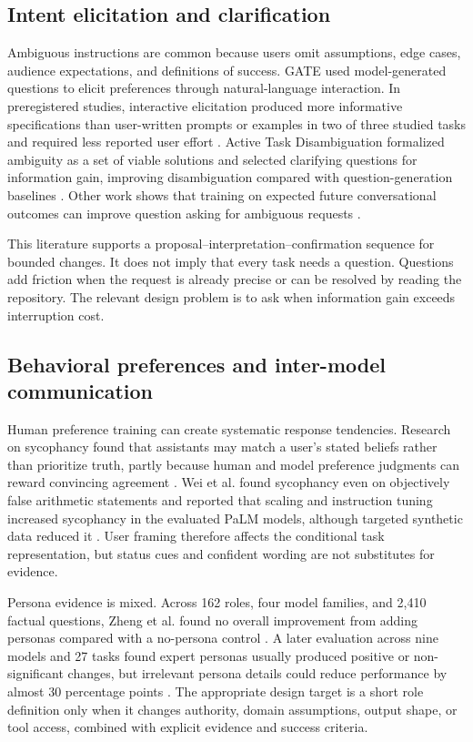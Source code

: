 \documentclass[11pt,a4paper]{article}
\begin{document}
\subsection{Intent elicitation and clarification}\label{sec:lit-intent}

Ambiguous instructions are common because users omit assumptions, edge cases, audience expectations, and definitions of success. GATE used model-generated questions to elicit preferences through natural-language interaction. In preregistered studies, interactive elicitation produced more informative specifications than user-written prompts or examples in two of three studied tasks and required less reported user effort \cite{li2025gate}. Active Task Disambiguation formalized ambiguity as a set of viable solutions and selected clarifying questions for information gain, improving disambiguation compared with question-generation baselines \cite{kobalczyk2025}. Other work shows that training on expected future conversational outcomes can improve question asking for ambiguous requests \cite{zhang2024clarify}.

This literature supports a proposal--interpretation--confirmation sequence for bounded changes. It does not imply that every task needs a question. Questions add friction when the request is already precise or can be resolved by reading the repository. The relevant design problem is to ask when information gain exceeds interruption cost.

\subsection{Behavioral preferences and inter-model communication}\label{sec:lit-communication}

Human preference training can create systematic response tendencies. Research on sycophancy found that assistants may match a user's stated beliefs rather than prioritize truth, partly because human and model preference judgments can reward convincing agreement \cite{sharma2023}. Wei et al. found sycophancy even on objectively false arithmetic statements and reported that scaling and instruction tuning increased sycophancy in the evaluated PaLM models, although targeted synthetic data reduced it \cite{wei2023sycophancy}. User framing therefore affects the conditional task representation, but status cues and confident wording are not substitutes for evidence.

Persona evidence is mixed. Across 162 roles, four model families, and 2,410 factual questions, Zheng et al. found no overall improvement from adding personas compared with a no-persona control \cite{zheng2024persona}. A later evaluation across nine models and 27 tasks found expert personas usually produced positive or non-significant changes, but irrelevant persona details could reduce performance by almost 30 percentage points \cite{luz2025persona}. The appropriate design target is a short role definition only when it changes authority, domain assumptions, output shape, or tool access, combined with explicit evidence and success criteria.
\end{document}
